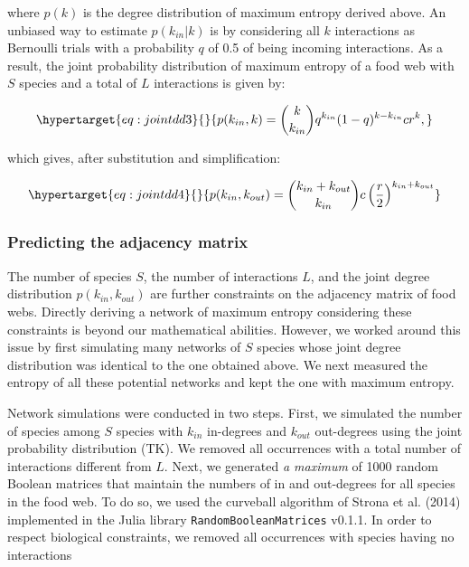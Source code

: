 \documentclass[10pt,oneside]{article}
\begin{document}
where \(p(k)\) is the degree distribution of maximum entropy derived
above. An unbiased way to estimate \(p(k_{in}|k)\) is by considering all
\(k\) interactions as Bernoulli trials with a probability \(q\) of 0.5
of being incoming interactions. As a result, the joint probability
distribution of maximum entropy of a food web with \(S\) species and a
total of \(L\) interactions is given by:

\begin{equation}\protect\hypertarget{eq:jointdd3}{}{p(k_{in},k) = {k\choose k_{in}}q^{k_{in}}(1-q)^{k-k_{in}}c r^{k},}\label{eq:jointdd3}\end{equation}

which gives, after substitution and simplification:

\begin{equation}\protect\hypertarget{eq:jointdd4}{}{p(k_{in},k_{out}) = {k_{in}+k_{out}\choose k_{in}}c \left(\frac{r}{2}\right)^{k_{in}+k_{out}}}\label{eq:jointdd4}\end{equation}

\hypertarget{predicting-the-adjacency-matrix}{%
\subsubsection{Predicting the adjacency
matrix}\label{predicting-the-adjacency-matrix}}

The number of species \(S\), the number of interactions \(L\), and the
joint degree distribution \(p(k_{in},k_{out})\) are further constraints
on the adjacency matrix of food webs. Directly deriving a network of
maximum entropy considering these constraints is beyond our mathematical
abilities. However, we worked around this issue by first simulating many
networks of \(S\) species whose joint degree distribution was identical
to the one obtained above. We next measured the entropy of all these
potential networks and kept the one with maximum entropy.

Network simulations were conducted in two steps. First, we simulated the
number of species among \(S\) species with \(k_{in}\) in-degrees and
\(k_{out}\) out-degrees using the joint probability distribution (TK).
We removed all occurrences with a total number of interactions different
from \(L\). Next, we generated \emph{a maximum} of 1000 random Boolean
matrices that maintain the numbers of in and out-degrees for all species
in the food web. To do so, we used the curveball algorithm of Strona et
al. (2014) implemented in the Julia library
\texttt{RandomBooleanMatrices} v0.1.1. In order to respect biological
constraints, we removed all occurrences with species having no
interactions
\end{document}
